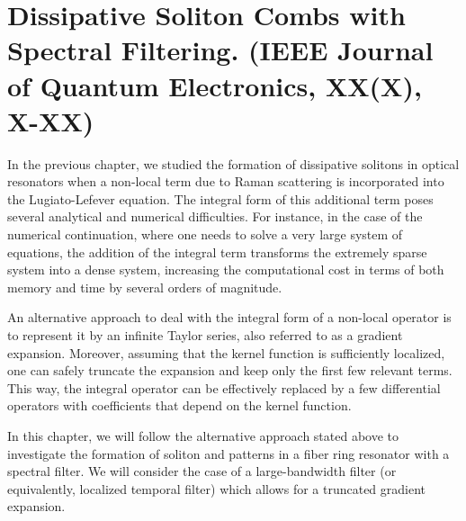 \chapter{Dissipative Soliton Combs with Spectral Filtering. (IEEE Journal of Quantum Electronics, XX(X), X-XX)}

In the previous chapter, we studied the formation of dissipative solitons in optical
resonators when a non-local
term due to Raman scattering is incorporated into the Lugiato-Lefever equation. The
integral form of this additional term poses several analytical and numerical difficulties.
For instance, in the case of the numerical continuation, where one needs to solve a very
large system of equations, the addition of the integral term transforms the extremely sparse
system into a dense system, increasing the computational cost in terms of both memory and time
by several orders of magnitude.

An alternative approach to deal with the integral form of a non-local operator is to represent
it by an infinite Taylor series, also referred to as a gradient expansion. Moreover, 
assuming that the kernel function is sufficiently localized, one can safely truncate the expansion
and keep only the first few relevant terms. This way, the integral operator can be
effectively replaced by a few differential operators with coefficients that depend on
the kernel function.

In this chapter, we will follow the alternative approach stated above to investigate
the formation of soliton and patterns in a fiber ring resonator with a spectral filter. 
We will consider the case of a large-bandwidth filter (or equivalently, localized temporal filter)
which allows for a truncated gradient expansion.
